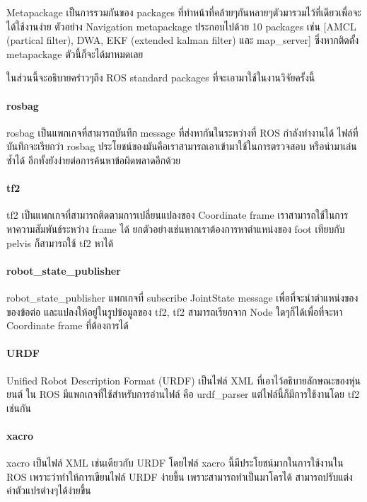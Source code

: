 Metapackage เป็นการรวมกันของ packages ที่ทำหน้าที่คล้ายๆกันหลายๆตัวมารวมไว้ที่เดียวเพื่อจะได้ใช้งานง่าย
ตัวอย่าง Navigation metapackage ประกอบไปด้วย 10 packages เช่น [AMCL (partical filter), DWA, EKF (extended kalman filter) 
และ map\_server] ซึ่งหากติดตั้ง metapackage ตัวนี้ก็จะได้มาหมดเลย

ในส่วนนี้จะอธิบายคร่าวๆถึง ROS standard packages ที่จะเอามาใช้ในงานวิจัยครั้งนี้

\paragraph*{rosbag}
rosbag เป็นแพกเกจที่สามารถบันทึก message ที่ส่งหากันในระหว่างที่ ROS กำลังทำงานได้
ไฟล์ที่บันทึกจะเรียกว่า rosbag ประโยชน์ของมันคือเราสามารถเอาเข้ามาใช้ในการตรวจสอบ
หรือนำมาเล่นซ้ำได้ อีกทั้งยังง่ายต่อการค้นหาข้อผิดพลาดอีกด้วย

\paragraph*{tf2}
tf2 เป็นแพกเกจที่สามารถติดตามการเปลี่ยนแปลงของ Coordinate frame เราสามารถใช้ในการหาความสัมพันธ์ระหว่าง
frame ได้ ยกตัวอย่างเช่นหากเราต้องการหาตำแหน่งของ foot เทียบกับ pelvis ก็สามารถใช้ tf2 หาได้

\paragraph*{robot\_state\_publisher}
robot\_state\_publisher แพกเกจที่ subscribe JointState message เพื่อที่จะนำตำแหน่งของของข้อต่อ
และแปลงให้อยู่ในรูปข้อมูลของ tf2, tf2 สามารถเรียกจาก Node ใดๆก็ได้เพื่อที่จะหา Coordinate frame ที่ต้องการได้

\paragraph*{URDF}
Unified Robot Description Format (URDF) เป็นไฟล์ XML ที่เอาไว้อธิบายลักษณะของหุ่นยนต์
ใน ROS มีแพกเกจที่ใช้สำหรับการอ่านไฟล์ คือ urdf\_parser แต่ไฟล์นี้ก็มีการใช้งานโดย tf2 เช่นกัน

\paragraph*{xacro}
xacro เป็นไฟล์ XML เช่นเดียวกับ URDF โดยไฟล์ xacro นี้มีประโยชน์มากในการใช้งานใน ROS เพราะว่าทำให้การเขียนไฟล์
URDF ง่ายขึ้น เพราะสามารถทำเป็นมาโครได้ สามารถปรับแต่งค่าตัวแปรต่างๆได้ง่ายขึ้น

\clearpage
